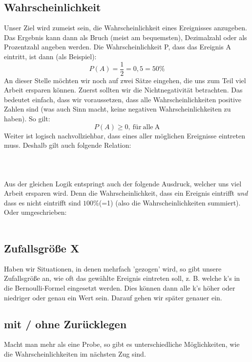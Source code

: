	\subsection{Wahrscheinlichkeit}
		Unser Ziel wird zumeist sein, die Wahrscheinlichkeit eines Ereignisses
		anzugeben. Das Ergebnis kann dann als Bruch (meist am bequemsten), Dezimalzahl
		oder als Prozentzahl angeben werden. Die Wahrscheinlichkeit P, dass das
		Ereignis A eintritt, ist dann (als Beispiel):
		\[P(A)=\frac{1}{2}=0,5=50\%\]
		An dieser Stelle möchten wir noch auf zwei Sätze eingehen, die uns zum Teil
		viel Arbeit ersparen können. Zuerst sollten wir die Nichtnegativität
		betrachten. Das bedeutet einfach, dass wir voraussetzen, dass alle
		Wahrscheinlichkeiten positive Zahlen sind (was auch Sinn macht, keine
		negativen Wahrscheinlichkeiten zu haben). So gilt:
		\[P(A)\geq 0 \mathrm{,\ für\ alle\ A}\]
		Weiter ist logisch nachvollziehbar, dass eines aller möglichen Ereignisse
		eintreten muss. Deshalb gilt auch folgende Relation:
		\\ \\
		\formel{\[P(\Omega)=P(A_1)+P(A_2)+ \ldots+ P(A_n)=1\]}
		\\ \\
		Aus der gleichen Logik entspringt auch der folgende Ausdruck, welcher uns viel
		Arbeit ersparen wird. Denn die Wahrscheinlichkeit, dass ein Ereignis eintrifft
		\emph{und} dass es nicht eintrifft sind \(100\%\)(=1) (also die
		Wahrscheinlichkeiten summiert). Oder umgeschrieben:
		\\ \\
		\formel{\[P(A)=1-P(\bar{A})\]}

	\subsection{Zufallsgröße X}
		Haben wir Situationen, in denen mehrfach 'gezogen' wird, so gibt unsere
		Zufallsgröße an, wie oft das gewählte Ereignis eintreten soll, z. B. welche
		k's in die Bernoulli-Formel eingesetzt werden. Dies können dann alle k's höher
		oder niedriger oder genau ein Wert sein. Darauf gehen wir später genauer ein.

	\subsection{mit / ohne Zurücklegen}
		Macht man mehr als eine Probe, so gibt es unterschiedliche Möglichkeiten, wie
		die Wahrscheinlichkeiten im nächsten Zug sind.\\
		
